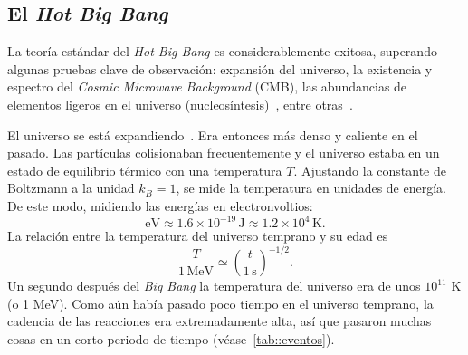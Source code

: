 \subsection{El \textit{Hot Big Bang}}
La teoría estándar del \textit{Hot Big Bang} es considerablemente exitosa, superando algunas pruebas clave de observación: expansión del universo, la existencia y espectro del \textit{Cosmic Microwave Background} (CMB), las abundancias de elementos ligeros en el universo (nucleosíntesis)~\cite{gamow1946expanding,alpher1948evolution,alpher1953physical}, entre otras~\cite{liddle1998introduction}.

El universo se está expandiendo~\cite{hubble1929relation}. Era entonces más denso y caliente en el pasado. Las partículas colisionaban frecuentemente y el universo estaba en un estado de equilibrio térmico con una temperatura \(T\). Ajustando la constante de Boltzmann a la unidad \(k_B=1\), se mide la temperatura en unidades de energía. De este modo, midiendo las energías en electronvoltios:
\begin{equation}
    \mathrm{eV}\approx 1.6\times 10^{-19}\,\mathrm{J}\approx 1.2\times 10^{4}\,\mathrm{K}.
\end{equation}
La relación entre la temperatura del universo temprano y su edad es~\cite{baumann2022cosmology}
\begin{equation}
    \frac{T}{1\,\mathrm{MeV}}\simeq \left(\frac{t}{1\,\mathrm{s}}\right)^{-1/2}.
\end{equation}
Un segundo después del \textit{Big Bang} la temperatura del universo era de unos \(10^{11}\) K (o 1 MeV). Como aún había pasado poco tiempo en el universo temprano, la cadencia de las reacciones era extremadamente alta, así que pasaron muchas cosas en un corto periodo de tiempo (véase~\autoref{tab::eventos}).
